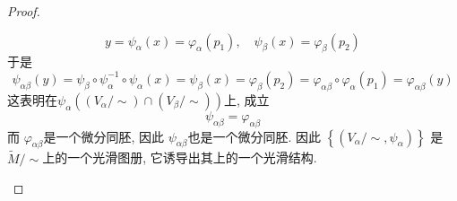 \documentclass[../main.tex]{subfiles}
\begin{document}
\begin{proof}
\begin{enumerate}
\begin{enumerate}
\[        y= \psi _{\alpha }\left( x \right)=  \varphi _{\alpha }\left( p_1 \right)  ,\quad \psi _{\beta }\left( x \right)=  \varphi _{\beta }\left( p_2 \right)  
        \] 于是   \[
        \psi _{\alpha \beta }\left( y \right) = \psi _{\beta }\circ \psi _{\alpha }^{-1} \circ \psi _{\alpha }\left( x \right)= \psi _{\beta }\left( x \right)= \varphi _{\beta }\left( p_2 \right)   =  \varphi _{\alpha \beta }\circ  \varphi _{\alpha }\left( p_1 \right)=  \varphi _{\alpha \beta }\left( y \right)  
        \]  这表明在\(  \psi _{\alpha }\left( \left( V_{\alpha }/\sim  \right)\cap \left( V_{\beta }/\sim  \right)   \right)   \)上, 成立 \[
        \psi _{\alpha \beta }=  \varphi _{\alpha \beta }
        \]而 \(   \varphi _{\alpha \beta }  \)是一个微分同胚, 因此 \(  \psi _{\alpha \beta }  \)也是一个微分同胚. 因此 \(  \left\{ \left( V_{\alpha }/\sim ,\psi _{\alpha } \right)  \right\}  \)   是 \(  \tilde{M}/\sim   \)上的一个光滑图册, 它诱导出其上的一个光滑结构. 
    \end{enumerate}
    
 \end{enumerate}
 
\end{proof}
\end{document}
